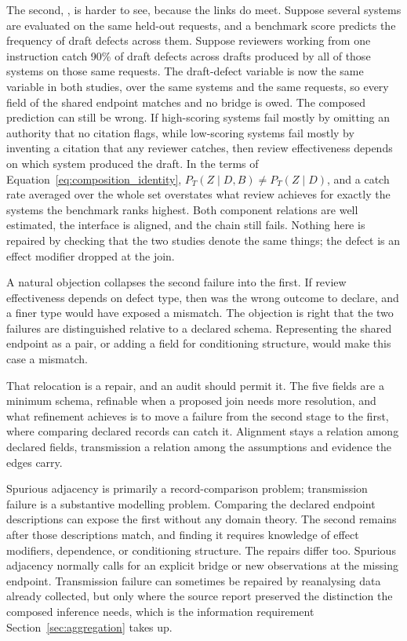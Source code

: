 \documentclass[12pt]{article}
\begin{document}
The second, , is harder to see, because the links do meet. Suppose several systems are evaluated on the same held-out requests, and a benchmark score predicts the frequency of draft defects across them. Suppose reviewers working from one instruction catch 90\% of draft defects across drafts produced by all of those systems on those same requests. The draft-defect variable is now the same variable in both studies, over the same systems and the same requests, so every field of the shared endpoint matches and no bridge is owed. The composed prediction can still be wrong. If high-scoring systems fail mostly by omitting an authority that no citation flags, while low-scoring systems fail mostly by inventing a citation that any reviewer catches, then review effectiveness depends on which system produced the draft. In the terms of Equation~\ref{eq:composition_identity}, \(P_T(Z\mid D,B)\neq P_T(Z\mid D)\), and a catch rate averaged over the whole set overstates what review achieves for exactly the systems the benchmark ranks highest. Both component relations are well estimated, the interface is aligned, and the chain still fails. Nothing here is repaired by checking that the two studies denote the same things; the defect is an effect modifier dropped at the join.

A natural objection collapses the second failure into the first. If review effectiveness depends on defect type, then  was the wrong outcome to declare, and a finer type would have exposed a mismatch. The objection is right that the two failures are distinguished relative to a declared schema. Representing the shared endpoint as a pair, or adding a field for conditioning structure, would make this case a mismatch.

That relocation is a repair, and an audit should permit it. The five fields are a minimum schema, refinable when a proposed join needs more resolution, and what refinement achieves is to move a failure from the second stage to the first, where comparing declared records can catch it. Alignment stays a relation among declared fields, transmission a relation among the assumptions and evidence the edges carry.

Spurious adjacency is primarily a record-comparison problem; transmission failure is a substantive modelling problem. Comparing the declared endpoint descriptions can expose the first without any domain theory. The second remains after those descriptions match, and finding it requires knowledge of effect modifiers, dependence, or conditioning structure. The repairs differ too. Spurious adjacency normally calls for an explicit bridge or new observations at the missing endpoint. Transmission failure can sometimes be repaired by reanalysing data already collected, but only where the source report preserved the distinction the composed inference needs, which is the information requirement Section~\ref{sec:aggregation} takes up.
\end{document}
